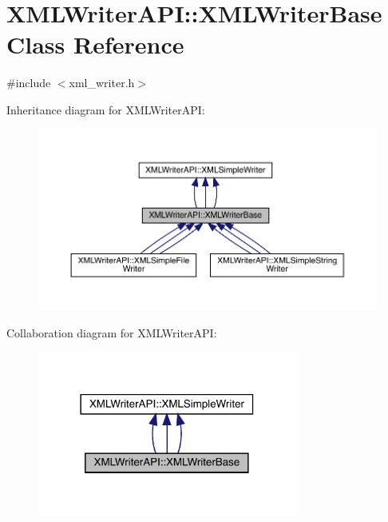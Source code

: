 \hypertarget{classXMLWriterAPI_1_1XMLWriterBase}{}\section{X\+M\+L\+Writer\+A\+PI\+:\+:X\+M\+L\+Writer\+Base Class Reference}
\label{classXMLWriterAPI_1_1XMLWriterBase}


{\ttfamily \#include $<$xml\+\_\+writer.\+h$>$}



Inheritance diagram for X\+M\+L\+Writer\+A\+PI\+:
\nopagebreak
\begin{figure}[H]
\begin{center}
\leavevmode
\includegraphics[width=350pt]{dc/d9f/classXMLWriterAPI_1_1XMLWriterBase__inherit__graph}
\end{center}
\end{figure}


Collaboration diagram for X\+M\+L\+Writer\+A\+PI\+:
\nopagebreak
\begin{figure}[H]
\begin{center}
\leavevmode
\includegraphics[width=242pt]{da/d4e/classXMLWriterAPI_1_1XMLWriterBase__coll__graph}
\end{center}
\end{figure}
